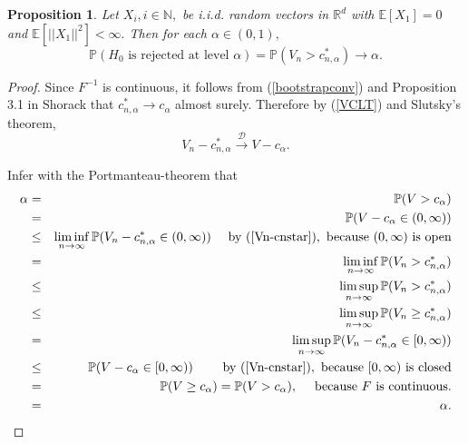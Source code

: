 \documentclass[sn-mathphys,Numbered]{sn-jnl}%
\theoremstyle{thmstyleone}%
\newtheorem{proposition}[theorem]{Proposition}%
\theoremstyle{thmstyletwo}%
\theoremstyle{thmstylethree}%
\begin{document}
\begin{proposition} \label{levelalphatestdfinite} Let $X_i, i \in \mathbb{N},$ be i.i.d. random vectors in $\mathbb{R}^d$ with
$\mathbb{E}[X_1]=0$ and $\mathbb{E}[||X_1||^2] < \infty.$ Then for each $\alpha \in (0,1),$
$$
  \mathbb{P}( H_0 \text{ is rejected at level } \alpha )= \mathbb{P}(V_n > c_{n,\alpha}^*) \rightarrow \alpha.
$$
\end{proposition}

\begin{proof}
Since $F^{-1}$ is continuous, it follows from (\ref{bootstrapconv}) and Proposition 3.1 in Shorack \cite{Shorack} that $c_{n,\alpha}^* \rightarrow c_\alpha$ almost surely. Therefore by (\ref{VCLT}) and Slutsky's theorem,
\begin{equation} \label{Vn-cnstar}
V_n-c_{n,\alpha}^* \stackrel{\mathcal{D}}{\rightarrow} V-c_\alpha.
\end{equation}

Infer with the Portmanteau-theorem that
\begin{eqnarray*}
\alpha &=& \mathbb{P}(V > c_\alpha)\\
&=&\mathbb{P}(V-c_\alpha \in (0,\infty))\\
&\le& \liminf_{n \rightarrow \infty}\mathbb{P}(V_n - c_{n,\alpha}^* \in (0,\infty)) \quad \text{ by } (\ref{Vn-cnstar}), \text{ because } (0,\infty) \text{ is open}\\
&=& \liminf_{n \rightarrow \infty}\mathbb{P}(V_n > c_{n,\alpha}^* )\\
&\le& \limsup_{n \rightarrow \infty}\mathbb{P}(V_n > c_{n,\alpha}^* )\\
&\le& \limsup_{n \rightarrow \infty}\mathbb{P}(V_n \ge c_{n,\alpha}^* )\\
&=& \limsup_{n \rightarrow \infty}\mathbb{P}(V_n - c_{n,\alpha}^* \in [0,\infty))\\
&\le& \mathbb{P}(V - c_\alpha \in [0,\infty)) \quad \quad \text{ by } (\ref{Vn-cnstar}), \text{ because } [0,\infty) \text{ is closed}\\
&=&\mathbb{P}(V \ge c_\alpha) = \mathbb{P}(V > c_\alpha), \quad \text{ because } F \text{ is continuous.}\\
&=&\alpha.
\end{eqnarray*}
\end{proof}
\end{document}
